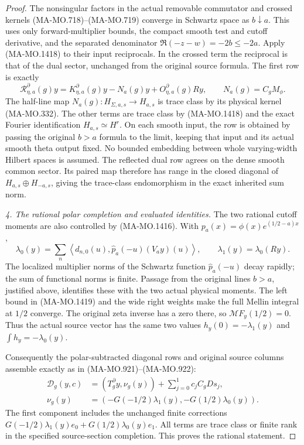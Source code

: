 \begin{proof}
The nonsingular factors in the actual removable commutator and
crossed kernels (MA-MO.718)--(MA-MO.719) converge in Schwartz
space as $b\downarrow a$.  This uses only forward-multiplier
bounds, the compact smooth test and cutoff derivative, and the
separated denominator $\Re(-z-w)=-2b\le-2a$.
Apply (MA-MO.1418) to their input reciprocals.  In the crossed
term the reciprocal is that of the dual sector, unchanged from
the original source formula.  The first row is exactly
\[
 \mathscr R_{\eta,a}^{\partial}(g)y
      =K_{\eta,a}^{\partial}(g)y-N_a(g)y
                         +O_{\eta,a}^{\partial}(g)Ry,
 \qquad N_a(g)=C_gM_\phi.
 \tag{MA-MO.1420}
\]
The half-line map $N_a(g):H_{\Sigma,a,s}\to H_{a,s}$ is
trace class by its physical kernel (MA-MO.332).
The other terms are trace class by (MA-MO.1418) and the
exact Fourier identification $H_{a,s}\simeq H^r$.
On each smooth input, the row is obtained by passing the
original $b>a$ formula to the limit, keeping that input and
its actual smooth theta output fixed.  No bounded embedding
between whole varying-width Hilbert spaces is assumed.
The reflected dual row agrees on the dense smooth common sector.
Its paired map therefore has range in the closed diagonal of
$H_{a,s}\oplus H_{-a,s}$, giving the trace-class endomorphism
in the exact inherited sum norm.

\emph{4. The rational polar completion and evaluated identities.}
The two rational cutoff moments are also controlled by
(MA-MO.1416).  With $p_a(x)=\phi(x)e^{(1/2-a)x}$,
\[
 \lambda_0(y)=\sum_n\left\langle d_{n,0}(u),
                 \widehat p_a(-u)(V_ay)(u)\right\rangle,
                \qquad\lambda_1(y)=\lambda_0(Ry).
 \tag{MA-MO.1421}
\]
The localized multiplier norms of the Schwartz function
$\widehat p_a(-u)$ decay rapidly; the sum of functional norms
is finite.  Passage from the original lines $b>a$, justified
above, identifies these with the two actual physical moments.
The left bound in (MA-MO.1419) and the wide right weights
make the full Mellin integral at $1/2$ converge.  The original
zeta inverse has a zero there, so $\mathcal MF_y(1/2)=0$.
Thus the actual source vector has the same two values
$h_y(0)=-\lambda_1(y)$ and $\int h_y=-\lambda_0(y)$.

Consequently the polar-subtracted diagonal rows and original
source columns assemble exactly as in (MA-MO.921)--(MA-MO.922):
\[
 \begin{aligned}
 \mathscr D_g(y,c)
     &=(T_g^\partial y,\nu_g(y))+\sum_{j=0}^1c_jC_gDs_j,\\
 \nu_g(y)&=(-G(-1/2)\lambda_1(y),-G(1/2)\lambda_0(y)).
 \end{aligned}
 \tag{MA-MO.1422}
\]
The first component includes the unchanged finite corrections
$G(-1/2)\lambda_1(y)e_0+G(1/2)\lambda_0(y)e_1$.
All terms are trace class or finite rank in the specified
source-section completion.  This proves the rational statement.


\end{proof}
